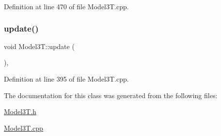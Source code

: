 Definition at line 470 of file Model3\+T.\+cpp.

\hypertarget{classModel3T_a3135a9e4636031960ff552687e8589ac}{}\label{classModel3T_a3135a9e4636031960ff552687e8589ac} 
\subsubsection{\texorpdfstring{update()}{update()}}
{\footnotesize\ttfamily void Model3\+T\+::update (\begin{DoxyParamCaption}{ }\end{DoxyParamCaption})\hspace{0.3cm}{\ttfamily [protected]}, {\ttfamily [virtual]}}



Definition at line 395 of file Model3\+T.\+cpp.



The documentation for this class was generated from the following files\+:\begin{DoxyCompactItemize}
\item 
\hyperlink{Model3T_8h}{Model3\+T.\+h}\item 
\hyperlink{Model3T_8cpp}{Model3\+T.\+cpp}\end{DoxyCompactItemize}
